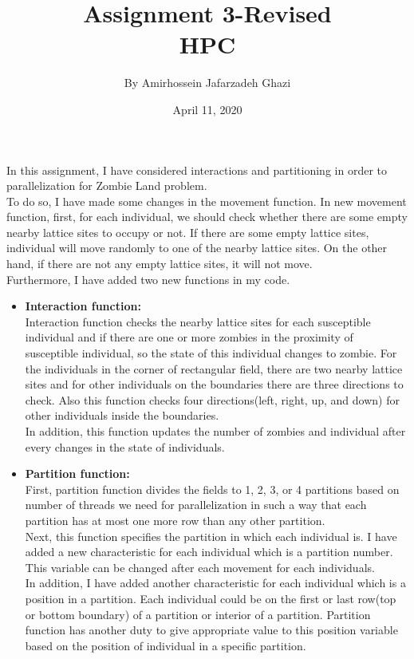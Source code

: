 \documentclass[12pt]{article}
\title{Assignment 3-Revised\\HPC}
\author{By Amirhossein Jafarzadeh Ghazi}
\date{April 11, 2020}
\begin{document}
\begin{titlepage}
\maketitle
\end{titlepage}
\hfill \break

In this assignment, I have considered interactions and partitioning in order to parallelization for Zombie Land problem.\\
To do so, I have made some changes in the movement function. In new movement function, first, for each individual, we should check whether there are some empty nearby lattice sites to occupy or not. If there are some empty lattice sites, individual will move randomly to one of the nearby lattice sites. On the other hand, if there are not any empty lattice sites, it will not move.\\
Furthermore, I have added two new functions in my code.\\
\begin{itemize}
\item \textbf{Interaction function:}\\
Interaction function checks the nearby lattice sites for each susceptible individual and if there are one or more zombies in the proximity of susceptible individual, so the state of this individual changes to zombie. For the individuals in the corner of rectangular field, there are two nearby lattice sites and for other individuals on the boundaries there are three directions to check. Also this function checks four directions(left, right, up, and down) for other individuals inside the boundaries.\\
In addition, this function updates the number of zombies and individual after every changes in the state of individuals.

\item \textbf{Partition function:}\\
First, partition function divides the fields to 1, 2, 3, or 4 partitions based on number of threads we need for parallelization in such a way that each partition has at most one more row than any other partition.\\
Next, this function specifies the partition in which each individual is. I have added a new characteristic for each individual which is a partition number. This variable can be changed after each movement for each individuals.\\
In addition, I have added another characteristic for each individual which is a position in a partition. Each individual could be on the first or last row(top or bottom boundary) of a partition or interior of a partition. Partition function has another duty to give appropriate value to this position variable based on the position of individual in a specific partition.
\\\\
\end{itemize}
\end{document}
